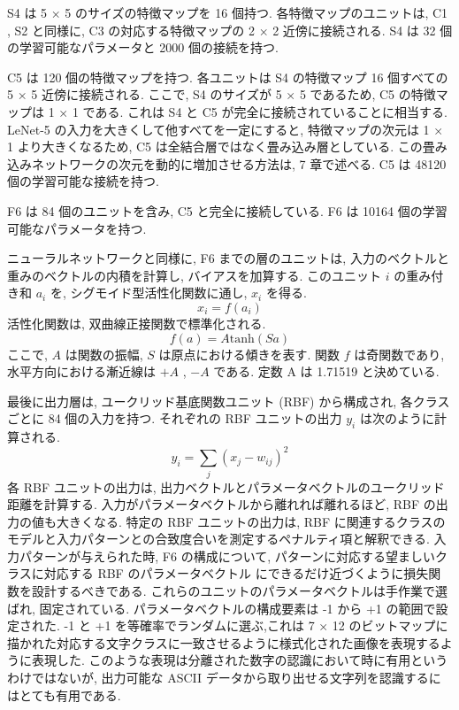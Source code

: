 \documentclass[twocolumn]{jarticle}     %
\begin{document}
  \par
  S4 は 5 × 5 のサイズの特徴マップを 16 個持つ. 各特徴マップのユニットは, C1 , S2 と同様に, C3 の対応する特徴マップの 2 × 2 近傍に接続される. S4 は 32 個の学習可能なパラメータと 2000 個の接続を持つ.
  \par
  C5 は 120 個の特徴マップを持つ. 各ユニットは S4 の特徴マップ 16 個すべての 5 × 5 近傍に接続される.
  ここで, S4 のサイズが 5 × 5 であるため, C5 の特徴マップは 1 × 1 である. これは S4 と C5 が完全に接続されていることに相当する. LeNet-5 の入力を大きくして他すべてを一定にすると, 特徴マップの次元は 1 × 1 より大きくなるため, C5 は全結合層ではなく畳み込み層としている. この畳み込みネットワークの次元を動的に増加させる方法は, 7 章で述べる. C5 は 48120 個の学習可能な接続を持つ.
\par
F6 は 84 個のユニットを含み, C5 と完全に接続している. F6 は 10164 個の学習可能なパラメータを持つ. 
\par
ニューラルネットワークと同様に, F6 までの層のユニットは, 入力のベクトルと重みのベクトルの内積を計算し, バイアスを加算する. このユニット $i$ の重み付き和 $a_i$ を, シグモイド型活性化関数に通し, $x_i$ を得る. 
\begin{equation}
  x_i = f(a_i)
\end{equation}
活性化関数は, 双曲線正接関数で標準化される.
\begin{equation}
   f(a) = A\mathrm{tanh}(Sa)
\end{equation}
ここで, $A$ は関数の振幅, $S$ は原点における傾きを表す. 関数 $f$ は奇関数であり, 水平方向における漸近線は $+A$ , $-A$ である. 定数 A は 1.71519 と決めている.
\par
最後に出力層は, ユークリッド基底関数ユニット (RBF) から構成され, 各クラスごとに 84 個の入力を持つ. それぞれの RBF ユニットの出力 $y_i$ は次のように計算される.
\begin{equation}
  y_i = \sum_{j} (x_j - w_{ij})^2
\end{equation} 
各 RBF ユニットの出力は, 出力ベクトルとパラメータベクトルのユークリッド距離を計算する. 入力がパラメータベクトルから離れれば離れるほど, RBF の出力の値も大きくなる. 
特定の RBF ユニットの出力は, RBF に関連するクラスのモデルと入力パターンとの合致度合いを測定するペナルティ項と解釈できる.
入力パターンが与えられた時,  F6 の構成について, パターンに対応する望ましいクラスに対応する RBF のパラメータベクトル
にできるだけ近づくように損失関数を設計するべきである.
これらのユニットのパラメータベクトルは手作業で選ばれ, 固定されている. パラメータベクトルの構成要素は -1 から +1 の範囲で設定された. -1 と +1 を等確率でランダムに選ぶ,これは 7 × 12 のビットマップに描かれた対応する文字クラスに一致させるように様式化された画像を表現するように表現した. このような表現は分離された数字の認識において時に有用というわけではないが, 出力可能な ASCII データから取り出せる文字列を認識するにはとても有用である.
\end{document}
